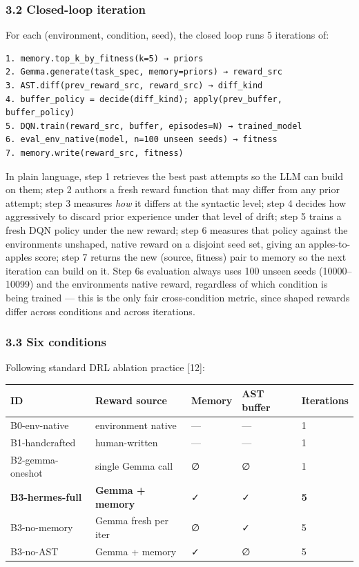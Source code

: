 \subsubsection{3.2 Closed-loop iteration}\label{32-closed-loop-iteration}

For each (environment, condition, seed), the closed loop runs 5 iterations of:

\begin{verbatim}
1. memory.top_k_by_fitness(k=5) → priors
2. Gemma.generate(task_spec, memory=priors) → reward_src
3. AST.diff(prev_reward_src, reward_src) → diff_kind
4. buffer_policy = decide(diff_kind); apply(prev_buffer, buffer_policy)
5. DQN.train(reward_src, buffer, episodes=N) → trained_model
6. eval_env_native(model, n=100 unseen seeds) → fitness
7. memory.write(reward_src, fitness)
\end{verbatim}

In plain language, step 1 retrieves the best past attempts so the LLM can build on them; step 2 authors a fresh reward function that may differ from any prior attempt; step 3 measures \emph{how} it differs at the syntactic level; step 4 decides how aggressively to discard prior experience under that level of drift; step 5 trains a fresh DQN policy under the new reward; step 6 measures that policy against the environment\textquotesingle s unshaped, native reward on a disjoint seed set, giving an apples-to-apples score; step 7 returns the new (source, fitness) pair to memory so the next iteration can build on it. Step 6\textquotesingle s evaluation always uses 100 unseen seeds (10000--10099) and the environment\textquotesingle s native reward, regardless of which condition is being trained --- this is the only fair cross-condition metric, since shaped rewards differ across conditions and across iterations.

\subsubsection{3.3 Six conditions}\label{33-six-conditions}

Following standard DRL ablation practice {[}12{]}:

{\def\LTcaptype{none} %
\begin{longtable}[]{@{}lllll@{}}
\toprule\noalign{}
ID & Reward source & Memory & AST buffer & Iterations \\
\midrule\noalign{}
\endhead
\bottomrule\noalign{}
\endlastfoot
B0-env-native & environment native & --- & --- & 1 \\
B1-handcrafted & human-written & --- & --- & 1 \\
B2-gemma-oneshot & single Gemma call & ∅ & ∅ & 1 \\
\textbf{B3-hermes-full} & \textbf{Gemma + memory} & ✓ & ✓ & \textbf{5} \\
B3-no-memory & Gemma fresh per iter & ∅ & ✓ & 5 \\
B3-no-AST & Gemma + memory & ✓ & ∅ & 5 \\
\end{longtable}
}


